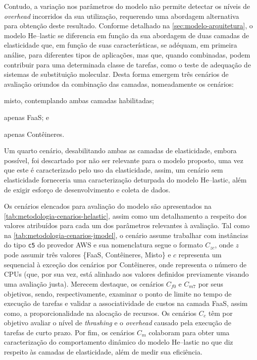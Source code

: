 \documentclass[english,brazilian]{UNISINOSmonografia} %
\begin{document}
Contudo, a variação nos parâmetros do modelo não permite detectar os níveis de \textit{overhead} incorridos da sua utilização, requerendo uma abordagem alternativa para obtenção deste resultado.
Conforme detalhado na \autoref{sec:modelo-arquitetura}, o modelo \textsf{He}--lastic se diferencia em função da sua abordagem de duas camadas de elasticidade que, em função de suas características, se adéquam, em primeira análise, para diferentes tipos de aplicações, mas que, quando combinadas, podem contribuir para uma determinada classe de tarefas, como o teste de adequação de sistemas de substituição molecular.
Desta forma emergem três cenários de avaliação oriundos da combinação das camadas, nomeadamente os cenários: 
\begin{inparaenum}[\itshape 1\upshape)] 
	\item misto, contemplando ambas camadas habilitadas;  
	\item apenas FaaS; e
	\item apenas Contêineres.
\end{inparaenum}
Um quarto cenário, desabilitando ambas as camadas de elasticidade, embora possível, foi descartado por não ser relevante para o modelo proposto, uma vez que este é caracterizado pelo uso da elasticidade, assim, um cenário sem elasticidade forneceria uma caracterização deturpada do modelo \textsf{He}--lastic, além de exigir esforço de desenvolvimento e coleta de dados.


Os cenários elencados para avaliação do modelo são apresentados na \autoref{tab:metodologia-cenarios-helastic}, assim como um detalhamento a respeito dos valores atribuídos para cada um dos parâmetros relevantes à avaliação.
Tal como na \autoref{tab:metodologia-cenarios-jmodel}, o cenário assume trabalhar com instâncias do tipo \texttt{c5} do provedor AWS e sua nomenclatura segue o formato $C_{zc}$, onde $z$ pode assumir três valores \{FaaS, Contêineres, Misto\} e $c$ representa um sequencial à exceção dos cenários por Contêineres, onde representa o número de CPUs (que, por sua vez, está alinhado aos valores definidos previamente visando uma avaliação justa).
Merecem destaque, os cenários $C_{f0}$ e $C_{m7}$ por seus objetivos, sendo, respectivamente, examinar o ponto de limite no tempo de execução de tarefas e validar a associatividade de custos na camada FaaS, assim como, a proporcionalidade na alocação de recursos.
Os cenários $C_{c}$ têm por objetivo avaliar o nível de \textit{thrashing} e o \textit{overhead} causado pela execução de tarefas de curto prazo.
Por fim, os cenários $C_{m}$ colaboram para obter uma caracterização do comportamento dinâmico do modelo \textsf{He}--lastic no que diz respeito às camadas de elasticidade, além de medir sua eficiência.
\end{document}
